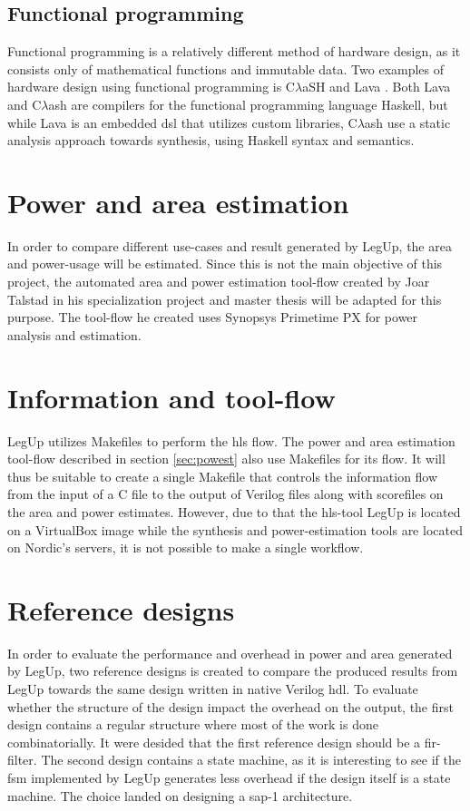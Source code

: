 \subsection{Functional programming}
Functional programming is a relatively different method of hardware design, as it consists only of mathematical functions and immutable data. Two examples of hardware design using functional programming is C$\lambda$aSH \cite{baaij2009clash} and Lava \cite{bjesse1998lava}. Both Lava and C$\lambda$ash are compilers for the functional programming language Haskell, but while Lava is an embedded \gls{dsl} that utilizes custom libraries, C$\lambda$ash use a static analysis approach towards synthesis, using Haskell syntax and semantics.

\section{\label{sec:powest}Power and area estimation}

In order to compare different use-cases and result generated by LegUp, the area and power-usage will be estimated. Since this is not the main objective of this project, the automated area and power estimation tool-flow created by Joar Talstad in his specialization project \cite{talstad14project} and master thesis \cite{talstad15master} will be adapted for this purpose. The tool-flow he created uses Synopsys Primetime PX for power analysis and estimation.

\section{Information and tool-flow}
LegUp utilizes Makefiles to perform the \gls{hls} flow. The power and area estimation tool-flow described in section \ref{sec:powest} also use Makefiles for its flow. It will thus be suitable to create a single Makefile that controls the information flow from the input of a C file to the output of Verilog files along with scorefiles on the area and power estimates. However, due to that the \gls{hls}-tool LegUp is located on a VirtualBox image while the synthesis and power-estimation tools are located on Nordic's servers, it is not possible to make a single workflow.

\section{Reference designs}
In order to evaluate the performance and overhead in power and area generated by LegUp, two reference designs is created to compare the produced results from LegUp towards the same design written in native Verilog \gls{hdl}. To evaluate whether the structure of the design impact the overhead on the output, the first design contains a regular structure where most of the work is done combinatorially. It were desided that the first reference design should be a \gls{fir}-filter. The second design contains a state machine, as it is interesting to see if the \gls{fsm} implemented by LegUp generates less overhead if the design itself is a state machine. The choice landed on designing a \gls{sap-1} architecture.
